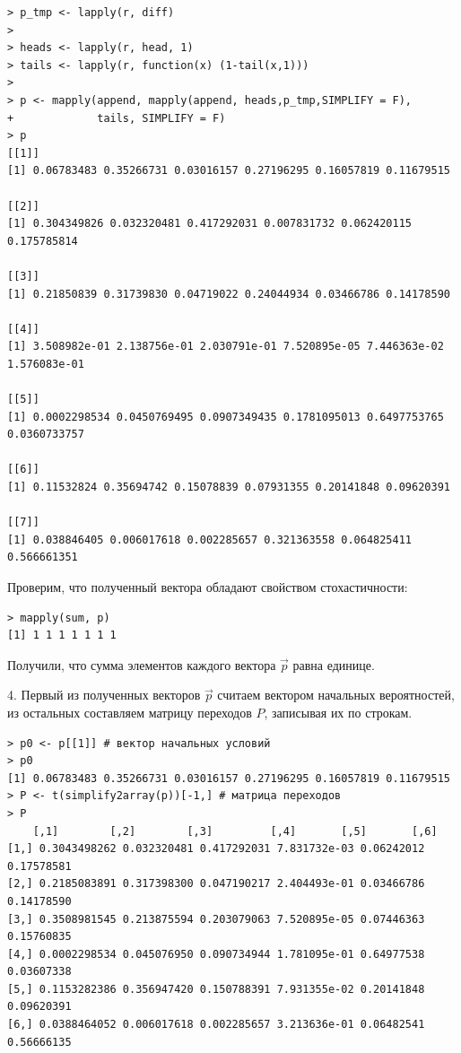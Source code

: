 \documentclass[14pt,a4paper]{scrartcl}
\begin{document}
\begin{verbatim}
> p_tmp <- lapply(r, diff)
> 
> heads <- lapply(r, head, 1)
> tails <- lapply(r, function(x) (1-tail(x,1)))
> 
> p <- mapply(append, mapply(append, heads,p_tmp,SIMPLIFY = F),
+             tails, SIMPLIFY = F)
> p
[[1]]
[1] 0.06783483 0.35266731 0.03016157 0.27196295 0.16057819 0.11679515

[[2]]
[1] 0.304349826 0.032320481 0.417292031 0.007831732 0.062420115 0.175785814

[[3]]
[1] 0.21850839 0.31739830 0.04719022 0.24044934 0.03466786 0.14178590

[[4]]
[1] 3.508982e-01 2.138756e-01 2.030791e-01 7.520895e-05 7.446363e-02 1.576083e-01

[[5]]
[1] 0.0002298534 0.0450769495 0.0907349435 0.1781095013 0.6497753765 0.0360733757

[[6]]
[1] 0.11532824 0.35694742 0.15078839 0.07931355 0.20141848 0.09620391

[[7]]
[1] 0.038846405 0.006017618 0.002285657 0.321363558 0.064825411 0.566661351
\end{verbatim}

Проверим, что полученный вектора обладают свойством стохастичности:

\begin{verbatim}
> mapply(sum, p)
[1] 1 1 1 1 1 1 1
\end{verbatim}

Получили, что сумма элементов каждого вектора $\vec{p}$ равна единице.

4. Первый из полученных векторов $\vec{p}$ считаем вектором начальных вероятностей, из остальных составляем матрицу переходов $P$, записывая их по строкам.

\begin{verbatim}
> p0 <- p[[1]] # вектор начальных условий
> p0
[1] 0.06783483 0.35266731 0.03016157 0.27196295 0.16057819 0.11679515
> P <- t(simplify2array(p))[-1,] # матрица переходов
> P
	[,1]        [,2]        [,3]         [,4]       [,5]       [,6]
[1,] 0.3043498262 0.032320481 0.417292031 7.831732e-03 0.06242012 0.17578581
[2,] 0.2185083891 0.317398300 0.047190217 2.404493e-01 0.03466786 0.14178590
[3,] 0.3508981545 0.213875594 0.203079063 7.520895e-05 0.07446363 0.15760835
[4,] 0.0002298534 0.045076950 0.090734944 1.781095e-01 0.64977538 0.03607338
[5,] 0.1153282386 0.356947420 0.150788391 7.931355e-02 0.20141848 0.09620391
[6,] 0.0388464052 0.006017618 0.002285657 3.213636e-01 0.06482541 0.56666135
\end{verbatim}
\end{document}
